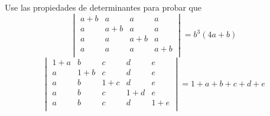 \item Use las propiedades de determinantes para probar que \\
    \[
        \begin{vmatrix}
            a + b & a & a & a \\ 
            a & a + b & a & a \\ 
            a & a & a + b & a \\ 
            a & a & a & a + b \\ 
        \end{vmatrix}
        =
        b^3(4a + b)
    \]
    \[
        \begin{vmatrix}
            1 + a & b & c & d & e \\
            a & 1 + b & c & d & e \\
            a & b & 1 + c & d & e \\
            a & b & c & 1 + d & e \\
            a & b & c & d & 1 + e \\
        \end{vmatrix}
        = 
        1 + a + b + c + d + e
    \]
